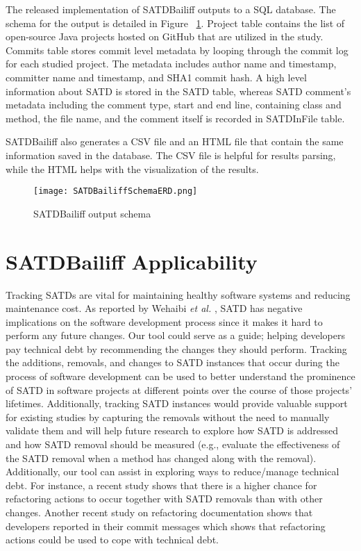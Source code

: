 \documentclass[3p]{elsarticle}
\newcommand{\approach}{SATDBailiff\xspace}
\begin{document}
The released implementation of \approach outputs to a SQL database. The schema for the output is detailed in Figure ~\ref{fig:schema}. Project table contains the list of open-source Java projects hosted on GitHub that are utilized in the study. Commits table stores commit level metadata by looping through the commit log for each studied project. The metadata includes author name and timestamp, committer name
and timestamp, and SHA1 commit hash. A high level information about SATD is stored in the SATD table, whereas SATD comment’s metadata including the comment type, start and end line, containing class and method, the file name, and the comment itself is recorded in SATDInFile table.

\approach  also generates a CSV file and an HTML file that contain the same information saved in the database. The CSV file is helpful for results parsing, while the HTML helps with the visualization of the results.


\begin{figure}
    \centering
    \texttt{[image: SATDBailiffSchemaERD.png]}
    \caption{\approach output schema}
    \label{fig:schema}
\end{figure}

\section{\approach Applicability}
\label{section:applicability}

Tracking SATDs are vital for maintaining healthy software systems and reducing maintenance cost. As reported by Wehaibi \textit{et al.} \cite{wehaibi2016examining}, SATD has negative implications on the software development process since it makes it hard to perform any future changes. Our tool could serve as a guide; helping developers pay technical debt by recommending the changes they should perform. Tracking the additions, removals, and changes to SATD instances that occur during the process of software development can be used to better understand the prominence of SATD in software projects at different points over the course of those projects’ lifetimes. Additionally, tracking SATD instances would provide valuable support for existing studies by capturing the removals without the need to manually validate them and will help future research to explore how SATD is addressed and how SATD removal should be measured (e.g., evaluate the effectiveness of the SATD removal when a method has changed along with the removal). Additionally, our tool can assist in exploring ways to reduce/manage technical debt. For instance, a recent study \cite{iammarino2019self} shows that  there is a higher chance for refactoring actions to occur together with SATD removals than with other changes. Another recent study on refactoring documentation \cite{alomar2019can,alomar2020toward,alomar2021we} shows that developers reported  in their commit messages which shows that refactoring actions could be used to cope with technical debt.
\end{document}
